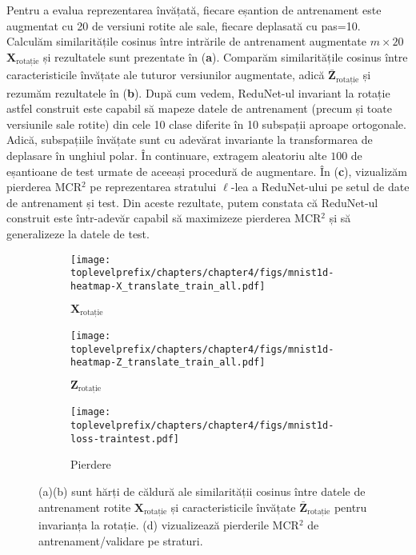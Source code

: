 \documentclass[../../book-main_ro.tex]{subfiles}
\begin{document}
\begin{example}
Pentru a evalua reprezentarea învățată, fiecare eșantion de antrenament este augmentat cu 20 de versiuni rotite ale sale, fiecare deplasată cu pas=10. Calculăm similaritățile cosinus între intrările de antrenament augmentate $m \times 20$ $\bm{X}_{\text{rotație}}$ și rezultatele sunt prezentate în  (\textbf{a}). 
Comparăm similaritățile cosinus între caracteristicile învățate ale tuturor versiunilor augmentate, adică $\bar{\bm{Z}}_{\text{rotație}}$ și rezumăm rezultatele în  (\textbf{b}). 
După cum vedem, ReduNet-ul invariant la rotație astfel construit este capabil să mapeze datele de antrenament (precum și toate versiunile sale rotite) din cele 10 clase diferite în 10 subspații aproape ortogonale. Adică, subspațiile învățate sunt cu adevărat invariante la transformarea de deplasare în unghiul polar. În continuare, extragem aleatoriu alte $100$ de eșantioane de test urmate de aceeași procedură de augmentare. 
În  (\textbf{c}), vizualizăm pierderea MCR$^{2}$ pe reprezentarea stratului $\ell$-lea a ReduNet-ului pe setul de date de antrenament și test. Din aceste rezultate, putem constata că ReduNet-ul construit este într-adevăr capabil să maximizeze pierderea MCR$^{2}$ și să generalizeze la datele de test.



\begin{figure}[t]
    \begin{subfigure}[t]{0.3\textwidth}
        \centering
        \texttt{[image: \\toplevelprefix/chapters/chapter4/figs/mnist1d-heatmap-X\_translate\_train\_all.pdf]}
        \caption{$\bm{X}_{\text{rotație}}$}
    \end{subfigure}
    \hfill
    \begin{subfigure}[t]{0.3\textwidth}
        \centering
        \texttt{[image: \\toplevelprefix/chapters/chapter4/figs/mnist1d-heatmap-Z\_translate\_train\_all.pdf]}
        \caption{$\bm{Z}_{\text{rotație}}$}
    \end{subfigure}
    \hfill
    \begin{subfigure}[t]{0.32\textwidth}
        \centering
        \texttt{[image: \\toplevelprefix/chapters/chapter4/figs/mnist1d-loss-traintest.pdf]}
        \caption{Pierdere}
    \end{subfigure}
    \caption{\small (a)(b) sunt hărți de căldură ale similarității cosinus între datele de antrenament rotite $\bm{X}_{\text{rotație}}$ și caracteristicile învățate $\bar{\bm{Z}}_{\text{rotație}}$ pentru invarianța la rotație. (d) vizualizează pierderile MCR$^2$ de antrenament/validare pe straturi.}
    \label{fig:redu-invariant-1d-mnist-diagram}
\end{figure}

\end{example}
\end{document}

